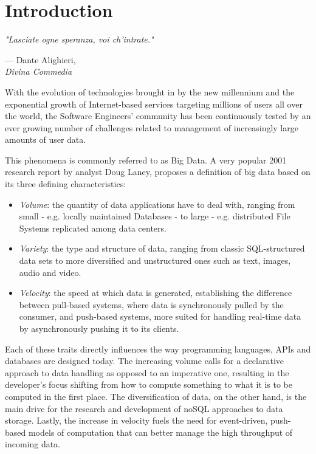 \let\textcircled=\pgftextcircled
\chapter*[Introduction]{Introduction}
\label{chap:intro}

\epigraph{\hspace{4ex}\textit{"Lasciate ogne speranza, voi ch'intrate."}}{--- Dante Alighieri,\\ \textit{Divina Commedia}}

 
With the evolution of technologies brought in by the new millennium and the exponential growth of Internet-based services targeting millions of users all over the world, the Software Engineers' community has been continuously tested by an ever growing number of challenges related to management of increasingly large amounts of user data\cite{furht2010handbook}. 

This phenomena is commonly referred to as Big Data. A very popular 2001 research report\cite{laney20013d} by analyst Doug Laney, proposes a definition of big data based on its three defining characteristics:

\begin{itemize}
\item \textit{Volume}: the quantity of data applications have to deal with, ranging from small - e.g. locally maintained Databases - to large - e.g. distributed File Systems replicated among data centers.
\item \textit{Variety}: the type and structure of data, ranging from classic SQL-structured data sets to more diversified and unstructured ones such as text, images, audio and  video. 
\item \textit{Velocity}: the speed at which data is generated, establishing the difference between pull-based systems, where data is synchronously pulled by the consumer, and push-based systems, more suited for handling real-time data by asynchronously pushing it to its clients.
\end{itemize}

Each of these traits directly influences the way programming languages, APIs and databases are designed today. The increasing volume calls for a declarative approach to data handling as opposed to an imperative one, resulting in the developer's focus shifting from how to compute something to what it is to be computed in the first place\cite{fahland2009declarative}. The diversification of data, on the other hand, is the main drive for the research and development of noSQL approaches to data storage. Lastly, the increase in velocity fuels the need for event-driven, push-based models of computation that can better manage the high throughput of incoming data\cite{meijer2012your}. 

